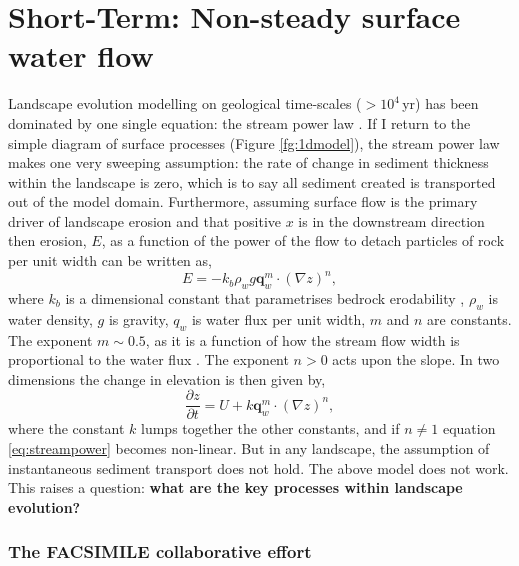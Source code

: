 \section{Short-Term: Non-steady surface water flow}

Landscape evolution modelling on geological time-scales ($>10^{4}$\,yr) has been dominated by one single equation: the stream power law \citep[see][]{howard-1983,howard-1994}. If I return to the simple diagram of surface processes (Figure \ref{fg:1dmodel}), the stream power law makes one very sweeping assumption: the rate of change in sediment thickness within the landscape is zero, which is to say all sediment created is transported out of the model domain. Furthermore, assuming surface flow is the primary driver of landscape erosion and that positive $x$ is in the downstream direction then erosion, $E$, as a function of the power of the flow to detach particles of rock per unit width can be written as,
\begin{equation}
E = -k_{b}\rho_{w}g\mathbf{q}_{w}^{m} \cdot \left(\nabla z\right)^{n},
\label{eq:streampower-inv}
\end{equation}
where $k_{b}$ is a dimensional constant that parametrises bedrock erodability \citep{howard-1983}, $\rho_{w}$ is water density, $g$ is gravity, $q_{w}$ is water flux per unit width, $m$ and $n$ are constants. The exponent $m \sim 0.5$, as it is a function of how the stream flow width is proportional to the water flux \citep[e.g.][]{lacey-1930}. The exponent $n>0$ acts upon the slope. In two dimensions the change in elevation is then given by,
\begin{equation}
\frac{\partial z}{\partial t} = U + k\mathbf{q}_{w}^{m} \cdot \left(\nabla z\right)^{n},
\label{eq:streampower}
\end{equation}
where the constant $k$ lumps together the other constants, and if $n\neq1$ equation \ref{eq:streampower} becomes non-linear. But in any landscape, the assumption of instantaneous sediment transport does not hold. The above model does not work. This raises a question: \textbf{what are the key processes within landscape evolution?}

\subsubsection*{The FACSIMILE collaborative effort}

